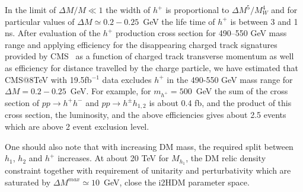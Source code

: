 In the limit of $\Delta M/M\ll 1$ the width of  $h^+$ is proportional to  $\Delta M^5/M_W^4$
and for particular values of $\Delta M\simeq 0.2-0.25$~GeV the  life time of  $h^+$ is between 3 and 1 ns.
After evaluation of the  $h^+$ production cross section for  490--550 GeV mass range
and applying efficiency for the  disappearing charged track signatures provided by  CMS~\cite{CMS:2014gxa}
as a function of charged track transverse momentum as well as efficiency for distance travelled by the charge particle,
we have estimated  that CMS@8TeV with 19.5fb$^{-1}$ data excludes  $h^+$  in the 490-550 GeV mass range for   $\Delta M=0.2-0.25$~GeV.
For example, for $m_{h^+}=500$~GeV the sum of the cross section of $pp\to{h^+}{h^-}$ and  $pp\to{h^\pm}{h_{1,2}}$
is about 0.4 fb, and the product of this cross section, the luminosity, and the above efficiencies gives about 2.5 events
which are above 2 event exclusion level.


One should also note that with increasing DM mass, the required split between $h_1$, $h_2$ and $h^+$
increases.
At about 20 TeV for $M_{h_1}$, the DM relic density constraint together with 
requirement of unitarity and perturbativity which are saturated by  $\Delta M^{max}\simeq 10$~GeV,
close the i2HDM parameter space.

